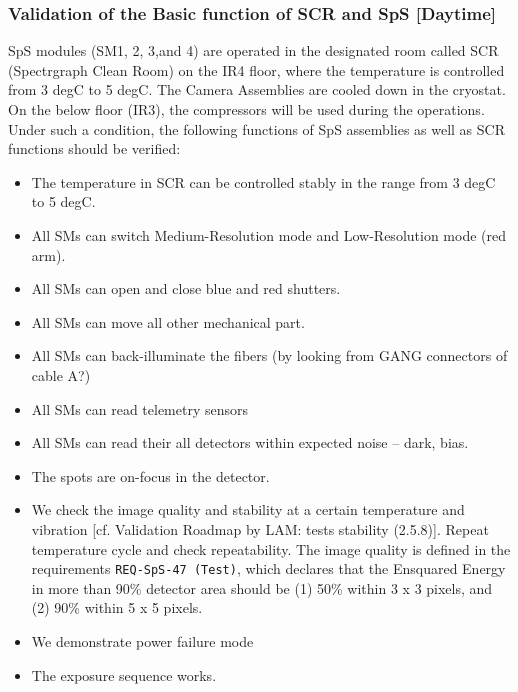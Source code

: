 \subsubsection{Validation of the Basic function of SCR and SpS [Daytime]}\label{secflow:SCR}

SpS modules (SM1, 2, 3,and 4) are operated in the designated room called SCR (Spectrgraph Clean Room) on the IR4 floor, where the temperature is controlled from 3 degC to 5 degC.
The Camera Assemblies are cooled down in the cryostat.
On the below floor (IR3), the compressors will be used during the operations.
Under such a condition, the following functions of SpS assemblies as well as SCR functions should be verified:
\begin{itemize}
\item The temperature in SCR can be controlled stably in the range from 3 degC to 5 degC.
\item All SMs can switch Medium-Resolution mode and Low-Resolution mode (red arm).
\item All SMs can open and close blue and red shutters.
\item All SMs can move all other mechanical part. 
\item All SMs can back-illuminate the fibers (by looking from GANG connectors of cable A?)
\item All SMs can read telemetry sensors
\item All SMs can read their all detectors within expected noise -- dark, bias.
\item The spots are on-focus in the detector.
\item We check the image quality and stability at a certain temperature and vibration [cf. Validation Roadmap by LAM: tests stability (2.5.8)].
Repeat temperature cycle and check repeatability.
The image quality is defined in the requirements {\tt REQ-SpS-47 (Test)}, which declares that the Ensquared Energy in more than 90\% detector area should be (1) 50\% within 3 x 3 pixels, and (2) 90\% within 5 x 5 pixels.
\item We demonstrate power failure mode
\item The exposure sequence works.
\end{itemize}


